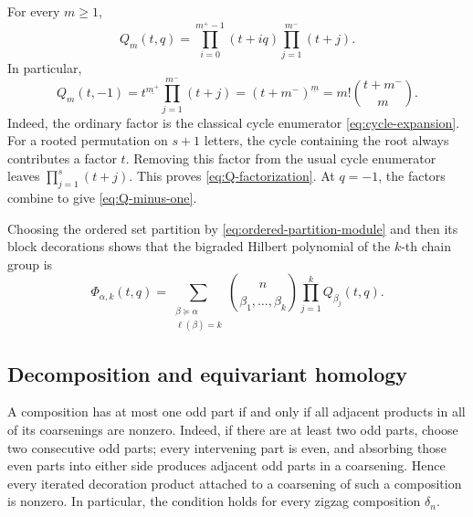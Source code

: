 \documentclass{amsart}
\theoremstyle{definition}
\theoremstyle{remark}
\begin{document}
For every $m\geq1$,
\begin{equation}
\label{eq:Q-factorization}
  Q_m(t,q)
  =\prod_{i=0}^{m^+-1}(t+iq)
     \prod_{j=1}^{m^-}(t+j).
\end{equation}
In particular,
\begin{equation}
\label{eq:Q-minus-one}
  Q_m(t,-1)
  =t^{\underline{m^+}}\prod_{j=1}^{m^-}(t+j)
  =(t+m^-)^{\underline m}
  =m!\binom{t+m^-}{m}.
\end{equation}
Indeed, the ordinary factor is the classical cycle enumerator
\eqref{eq:cycle-expansion}.  For a rooted permutation on $s+1$ letters, the
cycle containing the root always contributes a factor $t$.  Removing this
factor from the usual cycle enumerator leaves
$\prod_{j=1}^{s}(t+j)$.  This proves \eqref{eq:Q-factorization}.  At $q=-1$,
the factors combine to give \eqref{eq:Q-minus-one}.

Choosing the ordered set partition by \eqref{eq:ordered-partition-module}
and then its block decorations shows that the bigraded Hilbert polynomial of
the $k$-th chain group is
\begin{equation}
\label{eq:Phi-k-tq}
  \Phi_{\alpha,k}(t,q)
  =\sum_{\substack{\beta\succeq\alpha\\\ell(\beta)=k}}
     \binom{n}{\beta_1,\ldots,\beta_k}
     \prod_{j=1}^{k}Q_{\beta_j}(t,q).
\end{equation}

\subsection{Decomposition and equivariant homology}

A composition has at most one odd part if and only if all adjacent products
in all of its coarsenings are nonzero.  Indeed, if there are at least two odd
parts, choose two consecutive odd parts; every intervening part is even, and
absorbing those even parts into either side produces adjacent odd parts in a
coarsening.  Hence every iterated decoration product attached to a coarsening
of such a composition is nonzero.  In particular, the condition holds for
every zigzag composition $\delta_n$.
\end{document}
